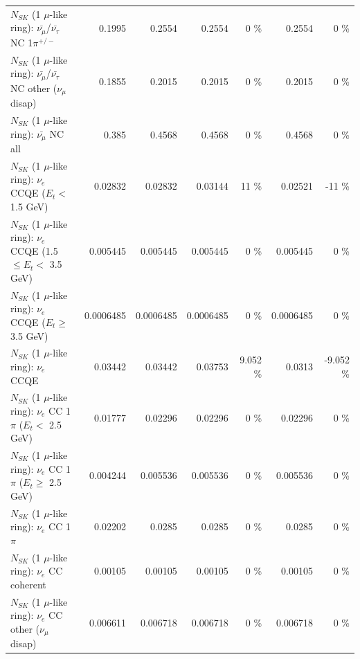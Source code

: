 \begin{table}
\begin{tabular}{| l | r | r | r  r | r  r |}
\hline
  $N_{SK}$ (1 $\mu$-like ring): $\bar{\nu_\mu}$/$\bar{\nu_\tau}$ NC 1$\pi^{+/-}$ &          0.1995 &          0.2554 &          0.2554 &        0 \%  &          0.2554 &        0 \%  \\ 
$N_{SK}$ (1 $\mu$-like ring): $\bar{\nu_\mu}$/$\bar{\nu_\tau}$ NC other ($\nu_\mu$ disap) &          0.1855 &          0.2015 &          0.2015 &        0 \%  &          0.2015 &        0 \%  \\ 
                          $N_{SK}$ (1 $\mu$-like ring): $\bar{\nu_{\mu}}$ NC all &           0.385 &          0.4568 &          0.4568 &        0 \%  &          0.4568 &        0 \%  \\ 
\hline
\hline
\hline
                  $N_{SK}$ (1 $\mu$-like ring): $\nu_e$ CCQE ($E_{t} <$ 1.5 GeV) &         0.02832 &         0.02832 &         0.03144 &       11 \%  &         0.02521 &      -11 \%  \\ 
         $N_{SK}$ (1 $\mu$-like ring): $\nu_e$ CCQE (1.5 $\leq E_{t} <$ 3.5 GeV) &        0.005445 &        0.005445 &        0.005445 &        0 \%  &        0.005445 &        0 \%  \\ 
               $N_{SK}$ (1 $\mu$-like ring): $\nu_e$ CCQE ($E_{t} \geq$ 3.5 GeV) &       0.0006485 &       0.0006485 &       0.0006485 &        0 \%  &       0.0006485 &        0 \%  \\ 
\hline
                                      $N_{SK}$ (1 $\mu$-like ring): $\nu_e$ CCQE &         0.03442 &         0.03442 &         0.03753 &    9.052 \%  &          0.0313 &   -9.052 \%  \\ 
\hline
             $N_{SK}$ (1 $\mu$-like ring): $\nu_e$ CC 1$\pi$ ($E_{t} <$ 2.5 GeV) &         0.01777 &         0.02296 &         0.02296 &        0 \%  &         0.02296 &        0 \%  \\ 
          $N_{SK}$ (1 $\mu$-like ring): $\nu_e$ CC 1$\pi$ ($E_{t} \geq$ 2.5 GeV) &        0.004244 &        0.005536 &        0.005536 &        0 \%  &        0.005536 &        0 \%  \\ 
\hline
                                 $N_{SK}$ (1 $\mu$-like ring): $\nu_e$ CC 1$\pi$ &         0.02202 &          0.0285 &          0.0285 &        0 \%  &          0.0285 &        0 \%  \\ 
                               $N_{SK}$ (1 $\mu$-like ring): $\nu_e$ CC coherent &         0.00105 &         0.00105 &         0.00105 &        0 \%  &         0.00105 &        0 \%  \\ 
                $N_{SK}$ (1 $\mu$-like ring): $\nu_e$ CC other ($\nu_\mu$ disap) &        0.006611 &        0.006718 &        0.006718 &        0 \%  &        0.006718 &        0 \%  \\ 

\end{tabular}
\end{table}
